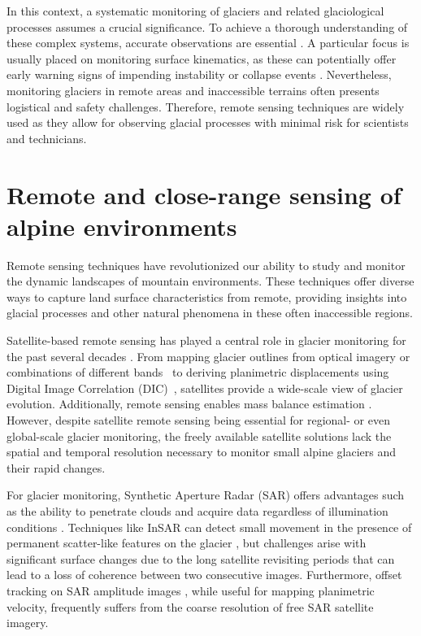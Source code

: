 In this context, a systematic monitoring of glaciers and related glaciological processes assumes a crucial significance.
To achieve a thorough understanding of these complex systems, accurate observations are essential \citep{Kaab2005}.
A particular focus is usually placed on monitoring surface kinematics, as these can potentially offer early warning signs of impending instability or collapse events \citep{Faillettaz2015}.
Nevertheless, monitoring glaciers in remote areas and inaccessible terrains often presents logistical and safety challenges.
Therefore, remote sensing techniques are widely used as they allow for observing glacial processes with minimal risk for scientists and technicians. 

\section{Remote and close-range sensing of alpine environments}

Remote sensing techniques have revolutionized our ability to study and monitor the dynamic landscapes of mountain environments. 
These techniques offer diverse ways to capture land surface characteristics from remote, providing insights into glacial processes and other natural phenomena in these often inaccessible regions.

Satellite-based remote sensing has played a central role in glacier monitoring for the past several decades \citep{Paul2007}. 
From mapping glacier outlines from optical imagery or combinations of different bands~\citep{Hall1995, Paul_2002, Winsvold2016} to deriving planimetric displacements using Digital Image Correlation (DIC)~\citep{Scambos1992, Kaab2005, Scherler2008, altena_kaab_2020}, satellites provide a wide-scale view of glacier evolution. 
Additionally, remote sensing enables mass balance estimation \citep{Bamber2007, Berthier2016, Rabatel2017, Berthier2023}.
However, despite satellite remote sensing being essential for regional- or even global-scale glacier monitoring, the freely available satellite solutions lack the spatial and temporal resolution necessary to monitor small alpine glaciers and their rapid changes.

For glacier monitoring, Synthetic Aperture Radar (SAR) offers advantages such as the ability to penetrate clouds and acquire data regardless of illumination conditions \citep{Fang2016, Winsvold2018, Strozzi2020}. 
Techniques like InSAR can detect small movement in the presence of permanent scatter-like features on the glacier \citep{schubert2013glacier}, but challenges arise with significant surface changes due to the long satellite revisiting periods that can lead to a loss of coherence between two consecutive images.
Furthermore, offset tracking on SAR amplitude images \citep{schellenberger2015sar}, while useful for mapping planimetric velocity, frequently suffers from the coarse resolution of free SAR satellite imagery.

